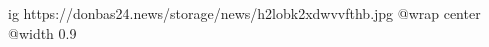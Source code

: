  
 
 
 
 

\ifcmt
  ig https://donbas24.news/storage/news/h2lobk2xdwvvfthb.jpg
  @wrap center
  @width 0.9
\fi
